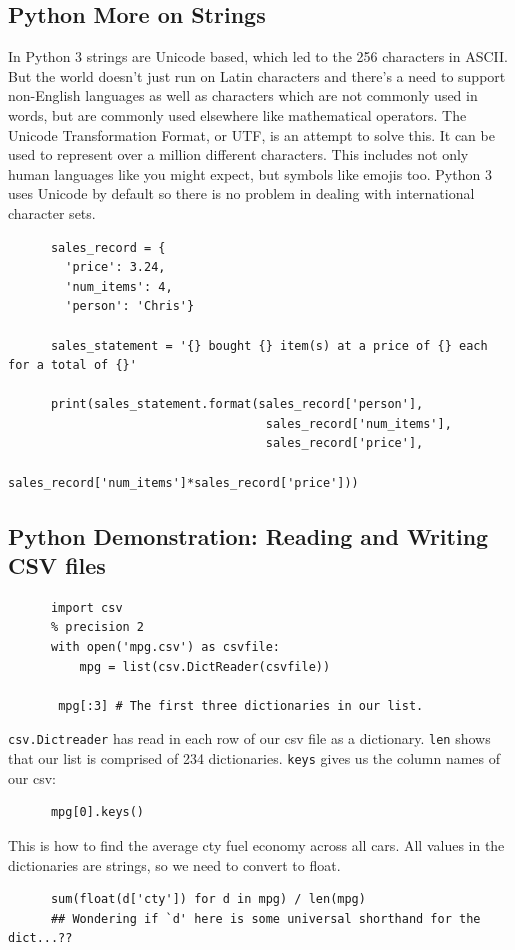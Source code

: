 \documentclass[11pt]{article}
\begin{document}
    \subsection{Python More on Strings}
    In Python 3 strings are Unicode based, which led to the 256
    characters in ASCII.  But the world doesn't just run on Latin
    characters and there's a need to support non-English languages as well
    as characters which are not commonly used in words, but are commonly
    used elsewhere like mathematical operators. The Unicode Transformation
    Format, or UTF, is an attempt to solve this. It can be used to
    represent over a million different characters. This includes not only
    human languages like you might expect, but symbols like emojis
    too. Python 3 uses Unicode by default so there is no problem in
    dealing with international character sets.
    \begin{lstlisting}
      sales_record = {
        'price': 3.24,
        'num_items': 4,
        'person': 'Chris'}
      
      sales_statement = '{} bought {} item(s) at a price of {} each for a total of {}'
      
      print(sales_statement.format(sales_record['person'],
                                    sales_record['num_items'],
                                    sales_record['price'],
                                    sales_record['num_items']*sales_record['price']))
    \end{lstlisting}

      
\newpage
    \subsection{Python Demonstration: Reading and Writing CSV files}
    \begin{lstlisting}
      import csv
      % precision 2
      with open('mpg.csv') as csvfile:
          mpg = list(csv.DictReader(csvfile))
          
       mpg[:3] # The first three dictionaries in our list.
    \end{lstlisting}
    {\tt csv.Dictreader} has read in each row of our csv file as a
    dictionary. {\tt len} shows that our list is comprised of 234
    dictionaries.
    {\tt keys} gives us the column names of our csv:
    \begin{lstlisting}
      mpg[0].keys()
    \end{lstlisting}
    This is how to find the average cty fuel economy across all cars. All values in the dictionaries are strings, so we need to convert to float.
    \begin{lstlisting}
      sum(float(d['cty']) for d in mpg) / len(mpg)
      ## Wondering if `d' here is some universal shorthand for the dict...??
    \end{lstlisting}
\end{document}
